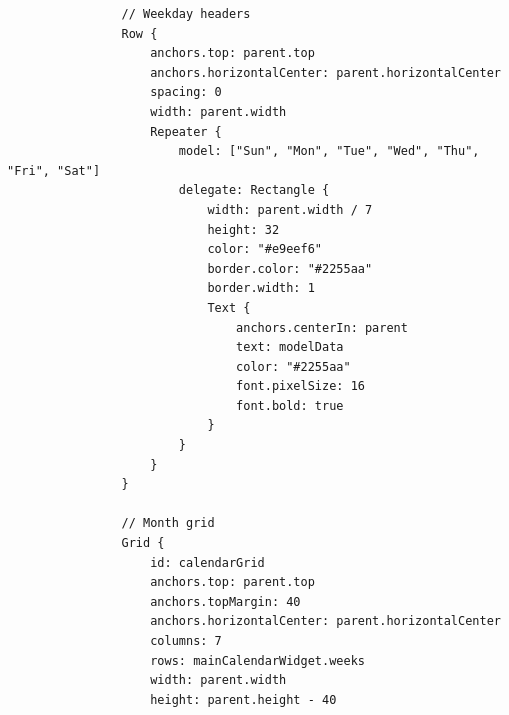 \documentclass{report}
\begin{document}
\begin{lstlisting}
                // Weekday headers
                Row {
                    anchors.top: parent.top
                    anchors.horizontalCenter: parent.horizontalCenter
                    spacing: 0
                    width: parent.width
                    Repeater {
                        model: ["Sun", "Mon", "Tue", "Wed", "Thu", "Fri", "Sat"]
                        delegate: Rectangle {
                            width: parent.width / 7
                            height: 32
                            color: "#e9eef6"
                            border.color: "#2255aa"
                            border.width: 1
                            Text {
                                anchors.centerIn: parent
                                text: modelData
                                color: "#2255aa"
                                font.pixelSize: 16
                                font.bold: true
                            }
                        }
                    }
                }
            
                // Month grid
                Grid {
                    id: calendarGrid
                    anchors.top: parent.top
                    anchors.topMargin: 40
                    anchors.horizontalCenter: parent.horizontalCenter
                    columns: 7
                    rows: mainCalendarWidget.weeks
                    width: parent.width
                    height: parent.height - 40
            

\end{lstlisting}
\end{document}
